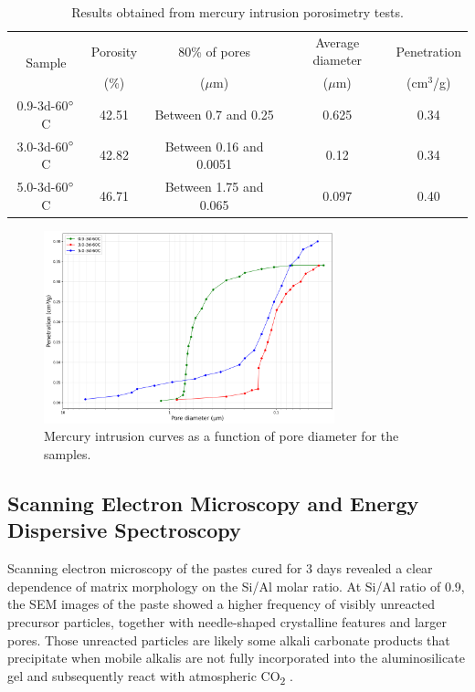 \begin{table}[H]
  \centering
  \caption{Results obtained from mercury intrusion porosimetry tests. \label{tab:mip}}
  \begin{tabular}{c c c c c}
    \hline
    \multirow{2}{*}{Sample} & Porosity & 80\% of pores  & Average diameter & Penetration  \\ 
    & (\%) & ($\mu$m) & ($\mu$m) & (cm$^3$/g) \\
    \hline
    0.9-3d-60$^{\circ}$C & 42.51 & Between 0.7 and 0.25 & 0.625 & 0.34 \\
    3.0-3d-60$^{\circ}$C & 42.82 & Between 0.16 and 0.0051 & 0.12 & 0.34 \\
    5.0-3d-60$^{\circ}$C & 46.71 & Between 1.75 and 0.065 & 0.097 & 0.40 \\
    \hline
  \end{tabular}
\end{table}

\begin{figure}[H]
  \centering
  \includegraphics[width=0.75\textwidth]{Cap4/images/mip_inverted.png}
  \caption{Mercury intrusion curves as a function of pore diameter for the samples.}
  \label{fig:mip}
\end{figure}

\subsection{Scanning Electron Microscopy and Energy Dispersive Spectroscopy}

Scanning electron microscopy of the pastes cured for 3 days revealed a clear dependence of matrix morphology on the Si/Al molar ratio.
At Si/Al ratio of 0.9, the SEM images of the paste showed a higher frequency of visibly unreacted precursor particles, together with needle-shaped crystalline features and larger pores. Those unreacted particles are likely some alkali carbonate products that precipitate when mobile alkalis are not fully incorporated into the aluminosilicate gel and subsequently react with atmospheric CO\textsubscript{2} \cite{provis2018alkali}.

